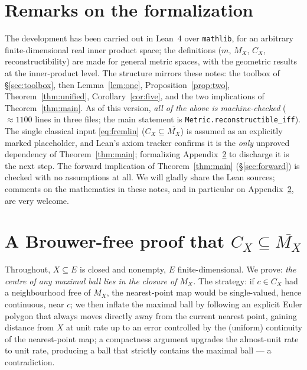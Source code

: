\documentclass[11pt]{article}
\theoremstyle{remark}
\newcommand{\X}{X}
\newcommand{\Mx}{M_{\X}}
\newcommand{\Cx}{C_{\X}}
\begin{document}
\section{Remarks on the formalization}\label{sec:lean}

The development has been carried out in Lean~4 over \texttt{mathlib}, for an arbitrary
finite-dimensional real inner product space; the definitions ($m$, $\Mx$, $\Cx$,
reconstructibility) are made for general metric spaces, with the geometric results at the
inner-product level. The structure mirrors these notes: the toolbox of \S\ref{sec:toolbox},
then Lemma~\ref{lem:one}, Proposition~\ref{prop:two}, Theorem~\ref{thm:unified},
Corollary~\ref{cor:five}, and the two implications of Theorem~\ref{thm:main}. As of this
version, \emph{all of the above is machine-checked} ($\approx1100$ lines in three files;
the main statement is \texttt{Metric.reconstructible\_iff}). The single classical input
\eqref{eq:fremlin} ($\Cx\subseteq\overline{\Mx}$) is assumed as an explicitly marked
placeholder, and Lean's axiom tracker confirms it is the \emph{only} unproved dependency of
Theorem~\ref{thm:main}; formalizing Appendix~\ref{app:fremlin} to discharge it is the next
step. The forward implication of Theorem~\ref{thm:main} (\S\ref{sec:forward}) is checked with
no assumptions at all. We will gladly share the Lean sources; comments on the mathematics in
these notes, and in particular on Appendix~\ref{app:fremlin}, are very welcome.

\appendix

\section{A Brouwer-free proof that \texorpdfstring{$\Cx\subseteq\overline{\Mx}$}{CX is contained
in the closure of MX}}\label{app:fremlin}

Throughout, $\X\subseteq E$ is closed and nonempty, $E$ finite-dimensional. We prove: \emph{the
centre of any maximal ball lies in the closure of $\Mx$.} The strategy: if $c\in\Cx$ had a
neighbourhood free of $\Mx$, the nearest-point map would be single-valued, hence continuous,
near $c$; we then inflate the maximal ball by following an explicit Euler polygon that always
moves directly away from the current nearest point, gaining distance from $\X$ at unit rate up
to an error controlled by the (uniform) continuity of the nearest-point map; a compactness
argument upgrades the almost-unit rate to unit rate, producing a ball that strictly contains the
maximal ball --- a contradiction.
\end{document}
